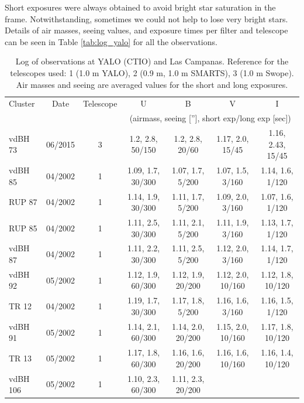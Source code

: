 \documentclass[draft]{aa}
\begin{document}
Short exposures were always obtained to avoid bright star saturation in the
frame. Notwithstanding, sometimes we could not help to lose very bright stars.
Details of air masses, seeing values, and exposure times per filter and
telescope can be seen in Table \ref{tab:log_yalo} for all the observations.


\begin{table}[ht]
    \centering
    \caption{Log of observations at YALO (CTIO) and Las Campanas.
    Reference for the telescopes used: 1 (1.0 m YALO), 2 (0.9 m, 1.0 m SMARTS),
    3 (1.0 m Swope). Air masses and seeing are averaged values for the short and
    long exposures.}
    \begin{tabular}{lcccccc}
    \hline \hline 
        Cluster & Date & Telescope & U & B & V &  I\\
                &      &           &
        \multicolumn{4}{c}{(airmass, seeing [''], short exp/long exp [sec])}\\
       \hline
        vdBH 73   & 06/2015 & 3 & 1.2, 2.8, 50/150 & 1.2, 2.8, 20/60 &
        1.17, 2.0, 15/45  & 1.16, 2.43, 15/45\\
        vdBH 85   & 04/2002 & 1 & 1.09, 1.7, 30/300 & 1.07, 1.7, 5/200 &
        1.07, 1.5, 3/160 & 1.14, 1.6, 1/120\\
        RUP 87    & 04/2002 & 1 & 1.14, 1.9, 30/300 & 1.11, 1.7, 5/200 &
        1.09, 2.0, 3/160 & 1.07, 1.6, 1/120\\
        RUP 85    & 04/2002 & 1 & 1.11, 2.5, 30/300 & 1.11, 2.1, 5/200 &
        1.11, 1.9, 3/160 & 1.13, 1.7, 1/120\\
        vdBH 87   & 04/2002 & 1 & 1.11, 2.2, 30/300 & 1.11, 2.5, 5/200 &
        1.12, 2.0, 3/160 & 1.14, 1.7, 1/120\\
        vdBH 92   & 05/2002 & 1 & 1.12, 1.9, 60/300 & 1.12, 1.9, 20/200 &
        1.12, 2.0, 10/160 & 1.12, 1.8, 10/120\\
        TR 12     & 04/2002 & 1 & 1.19, 1.7, 30/300 & 1.17, 1.8, 5/200 &
        1.16, 1.6, 3/160 & 1.16, 1.5, 1/120\\
        vdBH 91   & 05/2002 & 1 & 1.14, 2.1, 60/300 & 1.14, 2.0, 20/200 &
        1.15, 2.0, 10/160 & 1.17, 1.8, 10/120\\
        TR 13     & 05/2002 & 1 & 1.17, 1.8, 60/300 & 1.16, 1.6, 20/200 &
        1.16, 1.6, 10/160 & 1.16, 1.4, 10/120\\
        vdBH 106  & 05/2002 & 1 & 1.10, 2.3, 60/300 & 1.11, 2.3, 20/200 &

\end{tabular}
\end{table}
\end{document}
